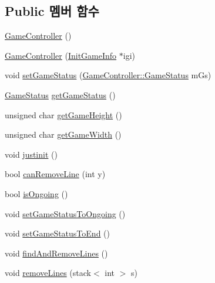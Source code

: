 \subsection*{Public 멤버 함수}
\begin{DoxyCompactItemize}
\item 
\hyperlink{class_tetris_1_1_game_controller_a968c9a79fca8a5a39e0c51edca0e5abb}{Game\+Controller} ()
\item 
\hyperlink{class_tetris_1_1_game_controller_a5dd9a021a0a87bed079bc1ad309e4039}{Game\+Controller} (\hyperlink{class_tetris_1_1_init_game_info}{Init\+Game\+Info} $\ast$igi)
\item 
void \hyperlink{class_tetris_1_1_game_controller_a013cef75ba09bdb7d95ae1df8497b8f5}{set\+Game\+Status} (\hyperlink{class_tetris_1_1_game_controller_a96a963b56385f3b3a122ff0ca2beb770}{Game\+Controller\+::\+Game\+Status} m\+Gs)
\item 
\hyperlink{class_tetris_1_1_game_controller_a96a963b56385f3b3a122ff0ca2beb770}{Game\+Status} \hyperlink{class_tetris_1_1_game_controller_a3b95b1b7a3a18c27402100f70c1ac1ab}{get\+Game\+Status} ()
\item 
unsigned char \hyperlink{class_tetris_1_1_game_controller_a10163479e02572450b886ff0654078b4}{get\+Game\+Height} ()
\item 
unsigned char \hyperlink{class_tetris_1_1_game_controller_a256cff75224efe165e1c5409c69b0503}{get\+Game\+Width} ()
\item 
void \hyperlink{class_tetris_1_1_game_controller_aef406397d4719c9edd49774d0343ce05}{justinit} ()
\item 
bool \hyperlink{class_tetris_1_1_game_controller_a912bb473994e869a610ab356086cb0ad}{can\+Remove\+Line} (int y)
\item 
bool \hyperlink{class_tetris_1_1_game_controller_aecd04e471f7819a8b3f80e0dda748bdc}{is\+Ongoing} ()
\item 
void \hyperlink{class_tetris_1_1_game_controller_a47681985e6fbf14411a70be08f85bf99}{set\+Game\+Status\+To\+Ongoing} ()
\item 
void \hyperlink{class_tetris_1_1_game_controller_a3c5e6034b2e2faf70371a13eb5f9c5bb}{set\+Game\+Status\+To\+End} ()
\item 
void \hyperlink{class_tetris_1_1_game_controller_ab19e8563acc9e724e130de60f87600b7}{find\+And\+Remove\+Lines} ()
\item 
void \hyperlink{class_tetris_1_1_game_controller_aa95d44d0084ac5537f1c753796df4565}{remove\+Lines} (stack$<$ int $>$ s)
\item 

\end{DoxyCompactItemize}
